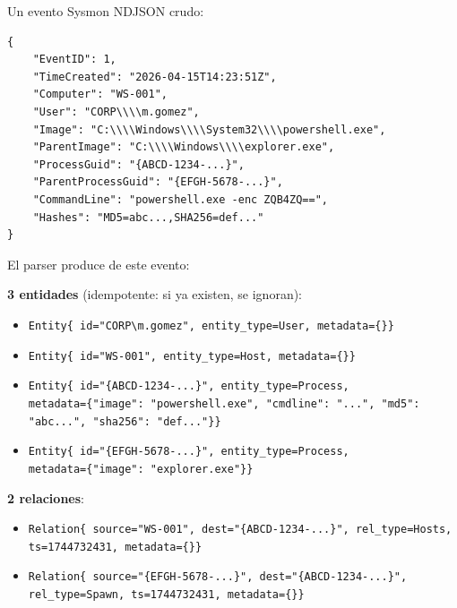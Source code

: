 \begin{ejemplo}
Un evento Sysmon NDJSON crudo:

\begin{lstlisting}
{
    "EventID": 1,
    "TimeCreated": "2026-04-15T14:23:51Z",
    "Computer": "WS-001",
    "User": "CORP\\\\m.gomez",
    "Image": "C:\\\\Windows\\\\System32\\\\powershell.exe",
    "ParentImage": "C:\\\\Windows\\\\explorer.exe",
    "ProcessGuid": "{ABCD-1234-...}",
    "ParentProcessGuid": "{EFGH-5678-...}",
    "CommandLine": "powershell.exe -enc ZQB4ZQ==",
    "Hashes": "MD5=abc...,SHA256=def..."
}
\end{lstlisting}

El parser  produce de este evento:

\textbf{3 entidades} (idempotente: si ya existen, se ignoran):
\begin{itemize}
    \item \texttt{Entity\{ id="CORP\textbackslash{}m.gomez", entity\_type=User, metadata=\{\}\}}
    \item \texttt{Entity\{ id="WS-001", entity\_type=Host, metadata=\{\}\}}
    \item \texttt{Entity\{ id="\{ABCD-1234-...\}", entity\_type=Process,\\
              metadata=\{"image": "powershell.exe", "cmdline": "...", "md5": "abc...", "sha256": "def..."\}\}}
    \item \texttt{Entity\{ id="\{EFGH-5678-...\}", entity\_type=Process,\\
              metadata=\{"image": "explorer.exe"\}\}}
\end{itemize}

\textbf{2 relaciones}:
\begin{itemize}
    \item \texttt{Relation\{ source="WS-001", dest="\{ABCD-1234-...\}", rel\_type=Hosts, ts=1744732431, metadata=\{\}\}}
    \item \texttt{Relation\{ source="\{EFGH-5678-...\}", dest="\{ABCD-1234-...\}", rel\_type=Spawn, ts=1744732431, metadata=\{\}\}}
\end{itemize}


\end{ejemplo}
